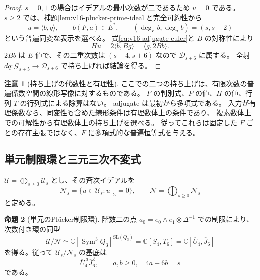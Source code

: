 \documentclass[a4paper,11pt]{ltjsarticle}
\theoremstyle{definition}
\newtheorem{theorem}{命題}[section]
\newtheorem{remark}[theorem]{注意}
\begin{document}
\begin{proof}
$s=0,1$ の場合はイデアルの最小次数が二であるため $u=0$ である。
$s\ge2$ では、補題\ref{lem:v16-plucker-prime-ideal}と完全可約性から
\[
 u=\langle b,q\rangle,\qquad b(F,a)\in E^*,\qquad
 (\deg_Fb,\deg_ab)=(s,s-2)
\]
という普遍同変な表示を選べる。
式\eqref{eq:v16-adjugate-euler}と $B$ の対称性により
\[
 Hu=2\langle b,Bg\rangle=\langle g,2Bb\rangle.
\]
$2Bb$ は $E$ 値で、その二重次数は $(s+4,s+6)$ なので
$\mathcal D_{s+6}$ に属する。
全射 $dq:\mathcal G_{s+5}\to\mathcal D_{s+6}$ で持ち上げれば結論を得る。
\end{proof}

\begin{remark}[持ち上げの代数性と有理性]
ここでの二つの持ち上げは、有限次数の普遍係数空間の線形写像に対するものである。
$F$ の判別式、$P$ の値、$H$ の値、行列 $T$ の行列式による除算はない。
adjugate は最初から多項式である。
入力が有理係数なら、同変性も含めた線形条件は有理数体上の条件であり、
複素数体上での可解性から有理数体上の持ち上げを選べる。
従ってこれらは固定した $F$ ごとの存在主張ではなく、$F$ に多項式的な普遍恒等式を与える。
\end{remark}

\subsection{単元制限環と三元三次不変式}

$\mathcal U=\bigoplus_{s\ge0}\mathcal U_s$ とし、その斉次イデアルを
\[
 \mathcal N_s=\{u\in\mathcal U_s:u|_\Sigma=0\},\qquad
 \mathcal N=\bigoplus_{s\ge0}\mathcal N_s
\]
と定める。

\begin{theorem}[単元のPl\"ucker制限環]
\label{thm:v16-unit-restriction-ring}
階数二の点 $a_0=e_0\wedge e_1\otimes\Delta^{-1}$ での制限により、次数付き環の同型
\begin{equation}\label{eq:v16-unit-restriction-ring}
 \mathcal U/\mathcal N
 \simeq\mathbb C[\operatorname{Sym}^3Q_3]^{\mathrm{SL}(Q_3)}
 =\mathbb C[S_4,T_6]
 =\mathbb C[\overline U_4,\overline J_6]
\end{equation}
を得る。従って $\mathcal U_s/\mathcal N_s$ の基底は
\[
 \overline U_4^{\,a}\overline J_6^{\,b},\qquad
 a,b\ge0,\quad 4a+6b=s
\]
である。
\end{theorem}
\end{document}
